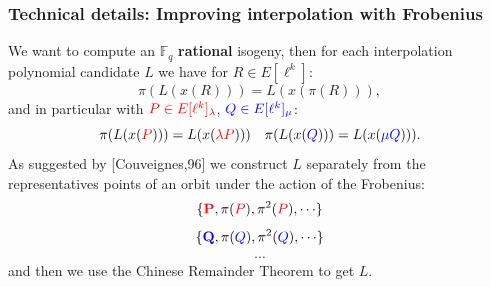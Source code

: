 \documentclass[10pt,a4paper]{beamer}
\theoremstyle{plain}
\theoremstyle{definition}
\theoremstyle{definition}
\theoremstyle{definition}
\theoremstyle{definition}
\theoremstyle{remark}
\theoremstyle{remark}
\def\red#1{\textcolor{red}{#1}}
\def\blu#1{\textcolor{blue}{#1}}
\begin{document}
\begin{frame}
\frametitle{Technical details: Improving interpolation with Frobenius}

We want to compute an $\mathbb{F}_q$ \textbf{rational} isogeny, then for each interpolation polynomial candidate $L$ we have for $R \in E[\ell^k]$: 
\[\pi(L(x(R)))=L(x(\pi(R))),\]
and in particular with $\color{red} P \in  E[\ell^k]_{\lambda}$, $\color{blue} Q \in  E[\ell^k]_{\mu} \color{black}$:
\[\pi(L(x(\red P)))=L(x(\color{red} \lambda P \color{black}))) \quad \pi(L(x(\blu Q)))=L(x(\color{blue} \mu Q \color{black}))).\]
\pause
As suggested by [Couveignes,96] we construct $L$ separately from the representatives points of an orbit under the action of the Frobenius: 
\[
\{ {\boldmath \color{red} \textbf{P}} \unboldmath , \pi(\red P), \pi^2(\red P), \cdots \color{black} \}  
\]
\[
\{ {\boldmath \color{blue} \textbf{Q}} \unboldmath , \pi(\blu Q), \pi^2(\blu Q), \cdots \color{black} \}  
\]
\[
\cdots
\]
and then we use the Chinese  Remainder Theorem to get $L$.

\end{frame}

\end{document}
